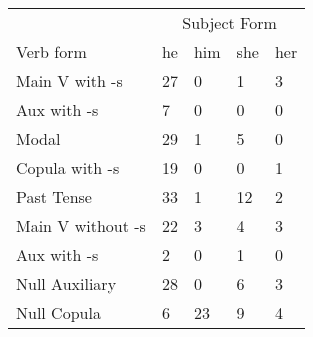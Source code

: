 \begin{table}[]
\begin{minipage}{0.5\textwidth}
\end{minipage}
\begin{minipage}{0.5\textwidth}
        \centering
    \begin{tabular}{@{}lllll@{}}
        \toprule
            &\multicolumn{4}{c}{Subject Form}\\
            \cline{2-5}
        Verb form & he & him & she & her \\
        \midrule
        Main V with -s & 27 & 0 & 1 & 3 \\
        Aux with -s & 7 & 0 & 0 & 0 \\
        Modal & 29 & 1 & 5 & 0 \\
        Copula with -s & 19 & 0 & 0 & 1 \\
        Past Tense & 33 & 1 & 12 & 2 \\
        \hline
        Main V without -s & 22 & 3 & 4 & 3 \\
        Aux with -s & 2 & 0 & 1 & 0 \\
        Null Auxiliary & 28 & 0 & 6 & 3 \\
        Null Copula & 6 & 23 & 9 & 4 \\
        \bottomrule
    \end{tabular}
    \end{minipage}
\end{table}
